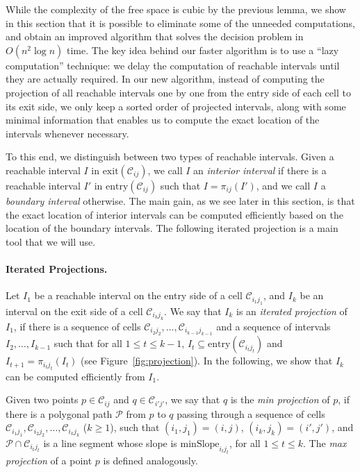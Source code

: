 \documentclass[12pt]{dalthesis}
\newcommand{\lee}{\leqslant}
\newcommand{\gee}{\geqslant}
\newcommand{\CP}{{\mathscr P}}
\newcommand{\CC}{{\mathscr C}}
\newcommand{\cell}[1]{{\CC_{#1}}}
\newcommand{\minS}[1]{\mbox{minSlope}_{#1}}
\newcommand{\entry}[1]{\mbox{entry}(\cell{#1})}
\newcommand{\exit}[1]{\mbox{exit}(\cell{#1})}
\newcommand{\proj}[1]{\pi_{#1}}
\begin{document}
While the complexity of the free space is cubic by the previous lemma,
we show in this section that it is possible to
eliminate some of the unneeded computations, and
obtain an improved algorithm that solves the decision problem in $O(n^2 \log n)$ time.
The key idea behind our faster algorithm is to use a ``lazy computation'' technique: 
we delay the computation of reachable intervals until they are actually required.
In our new algorithm, instead of computing the projection of all reachable intervals 
one by one from the entry side of each cell to its exit side, 
we only keep a sorted order of projected intervals,
along with some minimal information
that enables us to compute the exact location of the intervals whenever necessary.

To this end, we distinguish between two types of reachable intervals.
Given a reachable interval $I$ in $\exit{ij}$, 
we call $I$ an \emph{interior interval}
if there is a reachable interval $I'$ in $\entry{ij}$ such that $I = \proj{ij}(I')$,
and we call $I$ a \emph{boundary interval} otherwise.
The main gain, as we see later in this section, is that the exact location of interior intervals
can be computed efficiently based on the location of the boundary intervals.
The following iterated projection is a main tool that we will use.

\paragraph{Iterated Projections.}
Let $I_1$ be a reachable interval on the entry side of a cell $\cell{i_1j_1}$,
and $I_k$ be an interval on the exit side of a cell $\cell{i_kj_k}$.
We say that $I_k$ is an \emph{iterated projection} of $I_1$, if there is a sequence of cells $\cell{i_2j_2}, \ldots, \cell{i_{k-1}j_{k-1}}$
and a sequence of intervals $I_2, \ldots, I_{k-1}$ such that for all $1 \lee t \lee k-1$,
$I_t \subseteq \entry{i_tj_t}$ and $I_{t+1} = \proj{i_tj_t}(I_t)$
(see Figure~\ref{fig:projection}).
In the following, we show that $I_k$ can be computed efficiently from $I_1$.

Given two points $p \in \cell{ij}$ and $q \in \cell{i'j'}$,
we say that $q$ is the {\em min projection\/} of $p$, if there is a polygonal path $\CP$ from $p$ to $q$ passing through 
a sequence of cells $\cell{i_1j_1}, \cell{i_2j_2}, \ldots, \cell{i_kj_k}$ ($k \gee 1$),
such that $(i_1,j_1) = (i,j)$, $(i_k,j_k) = (i',j')$,
and $\CP \cap \cell{i_tj_t}$ is a line segment whose slope is $\minS{i_tj_t}$,
for all $1 \lee t \lee k$.
The {\em max projection\/} of a point $p$ is defined analogously. 
\end{document}
